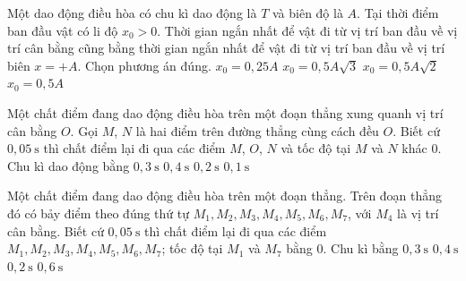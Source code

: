 \begin{ex}
Một dao động điều hòa có chu kì dao động là $T$ và biên độ là $A$. Tại thời điểm ban đầu vật có li độ $x_0\gt 0$. Thời gian ngắn nhất để vật đi từ vị trí ban đầu về vị trí cân bằng cũng bằng thời gian ngắn nhất để vật đi từ vị trí ban đầu về vị trí biên $x=+A$. Chọn phương án đúng.
\choice
{$x_0=0{,}25A$}
{$x_0=0,5A\sqrt{3}$}
{\True $x_0=0,5A\sqrt{2}$}
{$x_0=0{,}5A$}
\end{ex}

\begin{ex}
Một chất điểm đang dao động điều hòa trên một đoạn thẳng xung quanh vị trí cân bằng $O$. Gọi $M$, $N$ là hai điểm trên đường thẳng cùng cách đều $O$. Biết cứ $0,05\ \text{s}$ thì chất điểm lại đi qua các điểm $M$, $O$, $N$ và tốc độ tại $M$ và $N$ khác $0$. Chu kì dao động bằng
\choice
{\True $0,3\ \text{s}$}
{$0,4\ \text{s}$}
{$0,2\ \text{s}$}
{$0,1\ \text{s}$}
\end{ex}

\begin{ex}
Một chất điểm đang dao động điều hòa trên một đoạn thẳng. Trên đoạn thẳng đó có bảy điểm theo đúng thứ tự $M_1,M_2,M_3,M_4,M_5,M_6,M_7$, với $M_4$ là vị trí cân bằng. Biết cứ $0,05\ \text{s}$ thì chất điểm lại đi qua các điểm $M_1,M_2,M_3,M_4,M_5,M_6,M_7$; tốc độ tại $M_1$ và $M_7$ bằng $0$. Chu kì bằng
\choice
{$0,3\ \text{s}$}
{$0,4\ \text{s}$}
{$0,2\ \text{s}$}
{\True $0,6\ \text{s}$}
\end{ex}


